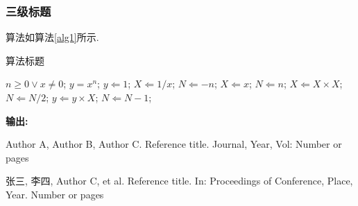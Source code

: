 \documentclass{SCIS2020cn}
\begin{document}
\subsubsection{三级标题}
算法如算法\ref{alg1}所示.
\begin{algorithm}
\renewcommand{\algorithmicrequire}{\textbf{输入:}}%
\renewcommand{\algorithmicensure}{\textbf{主迭代:}}%
\newcommand{\LASTCON}{\item[\algorithmiclastcon]}
\newcommand{\algorithmiclastcon}{\textbf{输出:}}%
\footnotesize
\caption{算法标题}
\label{alg1}
\begin{algorithmic}[1]
    \REQUIRE $n \geq 0 \vee x \neq 0$;
    \ENSURE $y = x^n$;
    \STATE $y \Leftarrow 1$;
        \STATE $X \Leftarrow 1 / x$;
        \STATE $N \Leftarrow -n$;
    \ELSE
        \STATE $X \Leftarrow x$;
        \STATE $N \Leftarrow n$;
    \ENDIF
            \STATE $X \Leftarrow X \times X$;
            \STATE $N \Leftarrow N / 2$;
        \ELSE[$N$ is odd]
            \STATE $y \Leftarrow y \times X$;
            \STATE $N \Leftarrow N - 1$;
        \ENDIF
    \ENDWHILE
    \LASTCON
\end{algorithmic}
\end{algorithm}



\begin{thebibliography}{99}

 Author A, Author B, Author C. Reference title. Journal, Year, Vol: Number or pages

 张三, 李四, Author C, et al. Reference title. In: Proceedings of Conference, Place, Year. Number or pages

\end{thebibliography}

\end{document}

